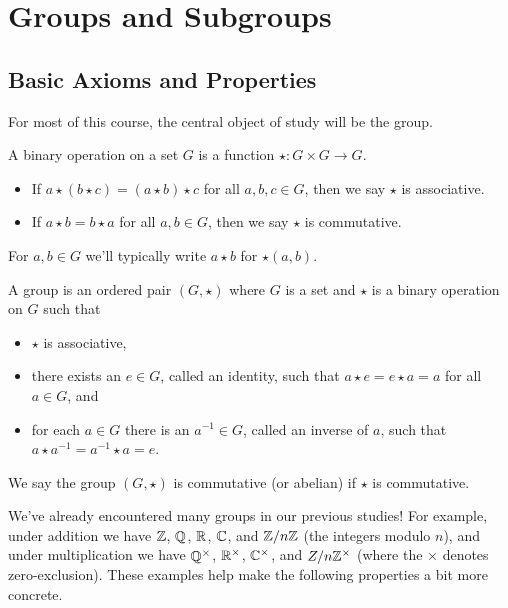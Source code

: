 \documentclass[../m171main.tex]{subfiles}
\begin{document}
\chapter{Groups and Subgroups}
\section{Basic Axioms and Properties}
For most of this course, the central object of study will be the group.

\begin{definition}
    A binary operation on a set $G$ is a function $\star : G \times G \to G$.
    \begin{itemize}
        \item If $a \star (b \star c) = (a \star b) \star c$ for all $a,b,c \in G$, then we say $\star$ is associative.
        \item If $a \star b = b \star a$ for all $a,b \in G$, then we say $\star$ is commutative.
    \end{itemize}
    For $a,b \in G$ we'll typically write $a \star b$ for $\star (a,b)$.
\end{definition}

\begin{definition}[Group]
    A group is an ordered pair $(G, \star)$ where $G$ is a set and $\star$ is a binary operation on $G$ such that
    \begin{itemize}
        \item $\star$ is associative,
        \item there exists an $e \in G$, called an identity, such that $a \star e = e \star a = a$ for all $a \in G$, and
        \item for each $a \in G$ there is an $a^{-1} \in G$, called an inverse of $a$, such that $a \star a^{-1} = a^{-1} \star a = e$.
    \end{itemize}
    We say the group $(G, \star)$ is commutative (or abelian) if $\star$ is commutative.
\end{definition}

We've already encountered many groups in our previous studies!
For example, under addition we have $\mathbb{Z}$, $\mathbb{Q}$, $\mathbb{R}$, $\mathbb{C}$, and $\mathbb{Z} / n\mathbb{Z}$ (the integers modulo $n$), and under multiplication we have $\mathbb{Q}^\times$, $\mathbb{R}^\times$, $\mathbb{C}^\times$, and $Z / n\mathbb{Z}^\times$ (where the $\times$ denotes zero-exclusion).
These examples help make the following properties a bit more concrete.
\end{document}
